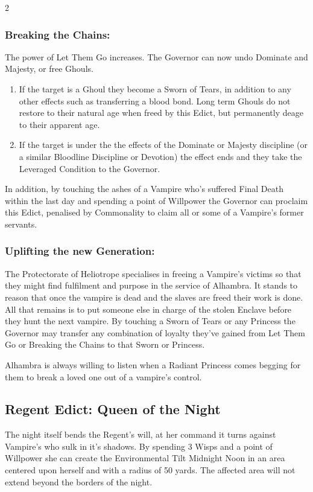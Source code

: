 \begin{multicols}{2}
\subsubsection*{Breaking the Chains:} The power of Let Them Go increases. The Governor can now undo Dominate and Majesty, or free Ghouls.

\begin{enumerate}\item If the target is a Ghoul they become a Sworn of Tears, in addition to any other effects such as transferring a blood bond. Long term Ghouls do not restore to their natural age when freed by this Edict, but permanently deage to their apparent age.
\item If the target is under the the effects of the Dominate or Majesty discipline (or a similar Bloodline Discipline or Devotion) the effect ends and they take the Leveraged Condition to the Governor.\end{enumerate}

In addition, by touching the ashes of a Vampire who's suffered Final Death within the last day and spending a point of Willpower the Governor can proclaim this Edict, penalised by Commonality to claim all or some of a Vampire's former servants.

\subsubsection*{Uplifting the new Generation:} The Protectorate of Heliotrope specialises in freeing a Vampire's victims so that they might find fulfilment and purpose in the service of Alhambra. It stands to reason that once the vampire is dead and the slaves are freed their work is done. All that remains is to put someone else in charge of the stolen Enclave before they hunt the next vampire. By touching a Sworn of Tears or any Princess the Governor may transfer any combination of loyalty they've gained from Let Them Go or Breaking the Chains to that Sworn or Princess. 

Alhambra is always willing to listen when a Radiant Princess comes begging for them to break a loved one out of a vampire's control.

\subsection*{Regent Edict: Queen of the Night}

The night itself bends the Regent’s will, at her command it turns against Vampire’s who sulk in it’s shadows. By spending 3 Wisps and a point of Willpower she can create the Environmental Tilt Midnight Noon in an area centered upon herself and with a radius of 50 yards. The affected area will not extend beyond the borders of the night.


\end{multicols}
